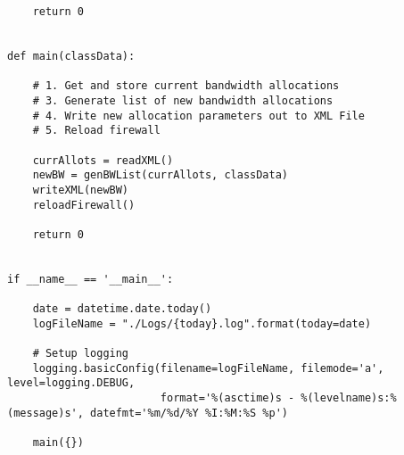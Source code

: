 \begin{verbatim}
    return 0


def main(classData):

    # 1. Get and store current bandwidth allocations
    # 3. Generate list of new bandwidth allocations
    # 4. Write new allocation parameters out to XML File
    # 5. Reload firewall

    currAllots = readXML()
    newBW = genBWList(currAllots, classData)
    writeXML(newBW)
    reloadFirewall()

    return 0


if __name__ == '__main__':

    date = datetime.date.today()
    logFileName = "./Logs/{today}.log".format(today=date)

    # Setup logging
    logging.basicConfig(filename=logFileName, filemode='a', level=logging.DEBUG,
                        format='%(asctime)s - %(levelname)s:%(message)s', datefmt='%m/%d/%Y %I:%M:%S %p')

    main({})
\end{verbatim}
